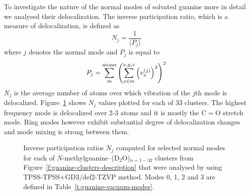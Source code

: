 \documentclass[b5paper,oneside,fleqn,11pt]{book}
\begin{document}
\begin{refsection}
To investigate the nature of the normal modes of solvated guanine
more in detail we analysed their delocalization. The inverse
participation ratio, which is a measure of delocalization, 
is defined as 
%
\begin{equation}  \label{e:ipr}
 N_j = \frac{1}{\langle P_j \rangle}
\end{equation}
%
where $j$ denotes the normal mode and $P_j$
is equal to
%
\begin{equation}  
 P_j = \sum_m^{\rm atoms} \left( 
         \sum_{x \in m}^{x,y,z} \left( v^{(j)}_x \right)^2
              \right)^2
\end{equation}
%
$N_j$ is the average number of atoms over which vibration of the $j$th
mode is delocalized. Figure~\ref{f:guanine-clusters-ipr} shows $N_j$ values
plotted for each of 33 clusters. The highest frequency mode
is delocalized over 2-3 atoms and it is mostly the C$=$O stretch mode.
Ring modes however exhibit substantial degree of delocalization changes
and mode mixing is strong between them.
%
\begin{figure}[t!]
\centering
\setlength\fboxsep{0.4pt}
\setlength\fboxrule{0.5pt}
\caption{
Inverse participation ratios $N_j$ computed for selected normal modes
for each of
$N$-methylguanine--(D$_2$O)$_{n=1-32}$ clusters from 
Figure~\ref{f:guanine-clusters-description} that were analysed
by using TPSS-TPSS+GD3/def2-TZVP method. Modes 0, 1, 2 and 3
are defined in Table~\ref{t:guanine-vacuum-modes}.
\label{f:guanine-clusters-ipr}}
\end{figure}
%


\end{refsection}
\end{document}

